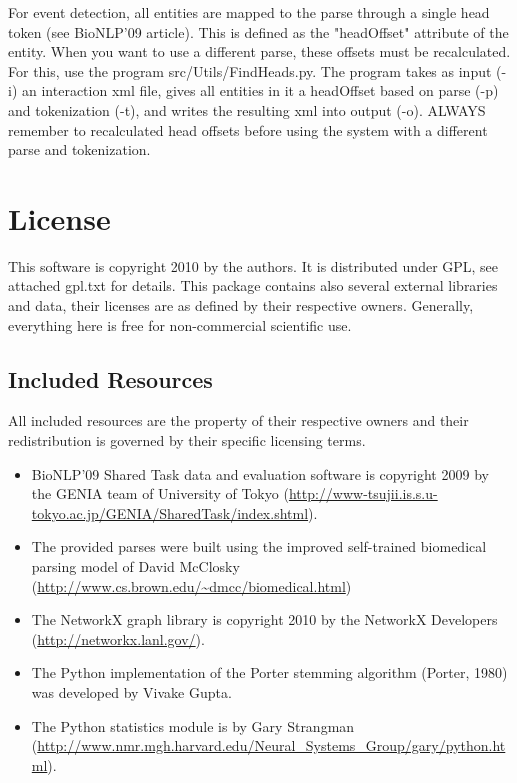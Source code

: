 \documentclass[a4paper,12pt]{article}
\begin{document}
For event detection, all entities are mapped to the parse through a single head
token (see BioNLP'09 article). This is defined as the "headOffset" attribute of
the entity. When you want to use a different parse, these offsets must be
recalculated. For this, use the program src/Utils/FindHeads.py. The program takes
as input (-i) an interaction xml file, gives all entities in it a headOffset
based on parse (-p) and tokenization (-t), and writes the resulting xml into
output (-o). ALWAYS remember to recalculated head offsets before using the
system with a different parse and tokenization.

\section{License}

This software is copyright 2010 by the authors. It is distributed under GPL, see
attached gpl.txt for details. This package contains also several external
libraries and data, their licenses are as defined by their respective owners.
Generally, everything here is free for non-commercial scientific use.

\subsection{Included Resources}

All included resources are the property of their respective owners and their
redistribution is governed by their specific licensing terms.

\begin{itemize}
\item BioNLP'09 Shared Task data and evaluation software is copyright 2009 by
the GENIA team of University of Tokyo 
(\url{http://www-tsujii.is.s.u-tokyo.ac.jp/GENIA/SharedTask/index.shtml}).
\item The provided parses were built using the improved self-trained biomedical
parsing model of David McClosky
(\url{http://www.cs.brown.edu/~dmcc/biomedical.html})
\item The NetworkX graph library is copyright 2010 by the NetworkX Developers
(\url{http://networkx.lanl.gov/}).
\item The Python implementation of the Porter stemming algorithm (Porter, 1980)
was developed by Vivake Gupta.
\item The Python statistics module is by Gary Strangman
(\url{http://www.nmr.mgh.harvard.edu/Neural_Systems_Group/gary/python.html}).
\end{itemize}
\end{document}
